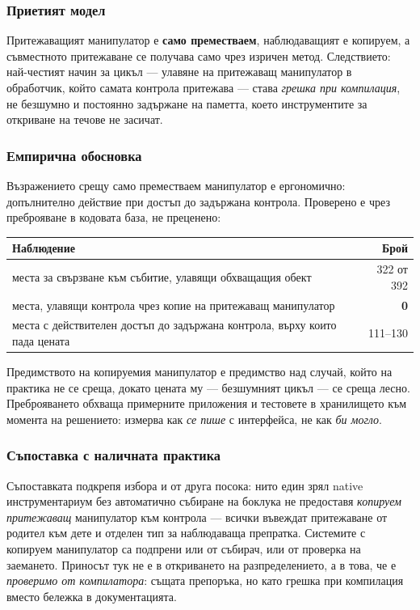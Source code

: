 \subsubsection{Приетият модел}

Притежаващият манипулатор е \textbf{само преместваем}, наблюдаващият е копируем, а
съвместното притежаване се получава само чрез изричен метод. Следствието: най-честият
начин за цикъл --- улавяне на притежаващ манипулатор в обработчик, който самата контрола
притежава --- става \emph{грешка при компилация}, не безшумно и постоянно задържане на
паметта, което инструментите за откриване на течове не засичат.

\subsubsection{Емпирична обосновка}

Възражението срещу само преместваем манипулатор е ергономично: допълнително действие при
достъп до задържана контрола. Проверено е чрез преброяване в кодовата база, не преценено:

\begin{center}
\begin{tabular}{@{}L{9.2cm}r@{}}
\textbf{Наблюдение} & \textbf{Брой} \\
\hline
места за свързване към събитие, улавящи обхващащия обект & 322 от 392 \\
места, улавящи контрола чрез копие на притежаващ манипулатор & \textbf{0} \\
места с действителен достъп до задържана контрола, върху които пада цената & 111--130 \\
\end{tabular}
\end{center}

Предимството на копируемия манипулатор е предимство над случай, който на практика не се
среща, докато цената му --- безшумният цикъл --- се среща лесно. Преброяването обхваща
примерните приложения и тестовете в хранилището към момента на решението: измерва как
\emph{се пише} с интерфейса, не как \emph{би могло}.

\subsubsection{Съпоставка с наличната практика}

Съпоставката подкрепя избора и от друга посока: нито един зрял native инструментариум без
автоматично събиране на боклука не предоставя \emph{копируем притежаващ} манипулатор към
контрола --- всички въвеждат притежаване от родител към дете и отделен тип за наблюдаваща
препратка. Системите с копируем манипулатор са подпрени или от събирач, или от проверка на
заемането. Приносът тук не е в откриването на разпределението, а в това, че е
\emph{проверимо от компилатора}: същата препоръка, но като грешка при компилация вместо
бележка в документацията.

